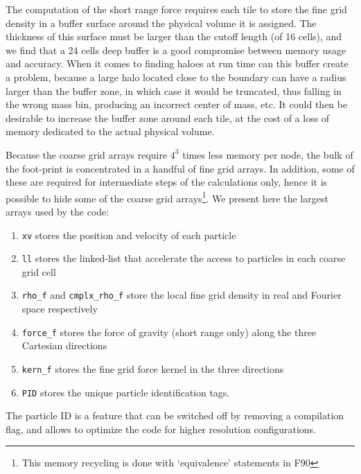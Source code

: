The computation of the short range force requires each tile to store the fine grid density in a buffer surface around the physical volume it is assigned. The thickness of this surface must be larger than the cutoff length (of 16 cells), and we find that a 24 cells deep buffer
is a good compromise between memory usage and accuracy.
When it comes to finding haloes at run time can this buffer create a problem, because a large halo located close to the boundary
can have a radius larger than the buffer zone, in which case it would be truncated, thus falling in the wrong mass bin, producing an incorrect center of mass, etc. 
It could then be desirable to increase the buffer zone around each tile, at the cost of a loss of memory dedicated to the actual physical volume.



Because the coarse grid arrays require $4^3$ times less memory per node, 
the bulk of the foot-print is concentrated in a handful of fine grid arrays.
In addition, some of these are required for intermediate steps of the calculations only, 
hence it is possible to hide some of the coarse grid arrays\footnote{ This memory recycling is done with `equivalence' statements in {\small F90}}.   
We present here the largest arrays used by the code:
\begin{enumerate}
\item{{\tt xv} stores the position and velocity of each particle} 
\item{{\tt ll} stores the linked-list that accelerate the access to particles in each coarse grid cell}
\item{{\tt rho\_f} and {\tt cmplx\_rho\_f} store 
the local fine grid density  in real and Fourier space respectively}
\item{{\tt force\_f} stores the force of gravity (short range only) along the three Cartesian directions}
\item{{\tt kern\_f} stores the fine grid force kernel in the three directions}
\item{{\tt PID} stores the unique particle identification tags.}
\end{enumerate}
The particle ID is a feature that can be switched off by removing a compilation flag, 
and allows to optimize the code for higher resolution configurations.

